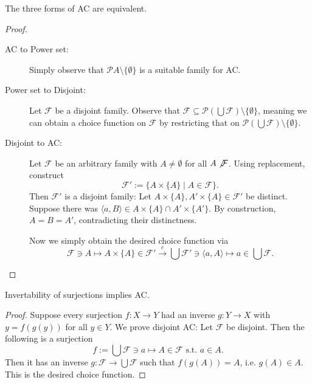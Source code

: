 \documentclass{whrartcl}
\newcommand{\FF}{\mathcal{F}}
\newcommand{\pow}{\mathcal{P}}
\begin{document}
\begin{theorem}
  The three forms of AC are equivalent.
\end{theorem}
\begin{proof}
  \
  \begin{description}
  \item[AC to Power set:] Simply observe that $\pow{A} \setminus \{\emptyset\}$
    is a suitable family for AC.
  \item[Power set to Disjoint:] Let $\FF$ be a disjoint family. Observe that
    $\FF \subseteq \pow(\bigcup \FF) \setminus \{\emptyset\}$, meaning we can
    obtain a choice function on $\FF$ by restricting that on $\pow(\bigcup \FF) \setminus \{\emptyset\}$.
  \item[Disjoint to AC:] Let $\FF$ be an arbitrary family with $A \neq
    \emptyset$ for all $A \not \FF$. Using replacement, construct
    \[
      \FF' := \{A \times \{A\} \mid A \in \FF\}.
    \]
    Then $\FF'$ is a disjoint family: Let $A \times \{A\}, A' \times \{A\} \in
    \FF'$ be distinct. Suppose there was $\langle a, B \rangle \in A \times
    \{A\} \cap A' \times \{A'\}$. By construction, $A = B = A'$, contradicting
    their distinctness.

    Now we simply obtain the desired choice function via
    \[
      \FF \ni A \mapsto A \times \{A\} \in \FF' \xrightarrow{c} \bigcup \FF' \ni
      \langle a, A \rangle \mapsto a \in \bigcup \FF.
    \]
  \end{description}
\end{proof}

\begin{lemma}
  Invertability of surjections implies AC.
\end{lemma}
\begin{proof}
  Suppose every surjection $f : X \to Y$ had an inverse $g : Y \to X$ with $y =
  f(g(y))$ for all $y \in Y$. We prove disjoint AC: Let $\FF$ be disjoint. Then
  the following is a surjection
  \[
    f := \bigcup \FF \ni a \mapsto A \in \FF \text{ s.t. } a \in A.
  \]
  Then it has an inverse $g : \FF \to \bigcup \FF$ such that $f(g(A)) = A$, i.e.
  $g(A) \in A$. This is the desired choice function.
\end{proof}
\end{document}
